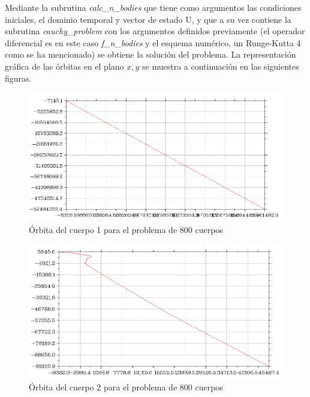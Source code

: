 \documentclass{article}
\begin{document}
	Mediante la subrutina \textit{calc\_n\_bodies} que tiene como argumentos las condiciones iniciales, el dominio temporal y vector de estado U, y que a su vez contiene la subrutina \textit{cauchy\_problem} con los argumentos definidos previamente (el operador diferencial es en este caso \textit{f\_n\_bodies} y el esquema numérico, un Runge-Kutta 4 como se ha mencionado) se obtiene la solución del problema. La representación gráfica de las órbitas en el plano $x,y$ se muestra a continuación en las siguientes figuras.
	
	\newpage
	
	\begin{figure}[h!]
		\begin{center}
			\includegraphics[scale=0.45]{nbodies1.png}
			\caption{Órbita del cuerpo 1 para el problema de 800 cuerpos}
		\end{center}
	\end{figure}

	\begin{figure}[h!]
		\begin{center}
			\includegraphics[scale=0.45]{nbodies2.png}
			\caption{Órbita del cuerpo 2 para el problema de 800 cuerpos}
		\end{center}
	\end{figure}
\end{document}
